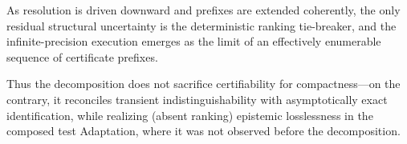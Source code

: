 \documentclass[12pt]{article}
\theoremstyle{definition}
\theoremstyle{plain}
\begin{document}
\begin{enumerate}
        As resolution is driven downward and prefixes are extended coherently, the only residual structural uncertainty is the deterministic ranking tie-breaker, and the infinite-precision execution emerges as the limit of an effectively enumerable sequence of certificate prefixes. 
        
        Thus the decomposition does not sacrifice certifiability for compactness—on the contrary, it reconciles transient indistinguishability with asymptotically exact identification, while realizing (absent ranking) epistemic losslessness in the composed test Adaptation, where it was not observed before the decomposition.


          
\end{enumerate}
\end{document}

